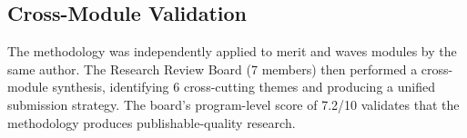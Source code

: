 \subsection{Cross-Module Validation}

The methodology was independently applied to merit and waves modules by the same author. The Research Review Board (7 members) then performed a cross-module synthesis, identifying 6 cross-cutting themes and producing a unified submission strategy. The board's program-level score of 7.2/10 validates that the methodology produces publishable-quality research.

